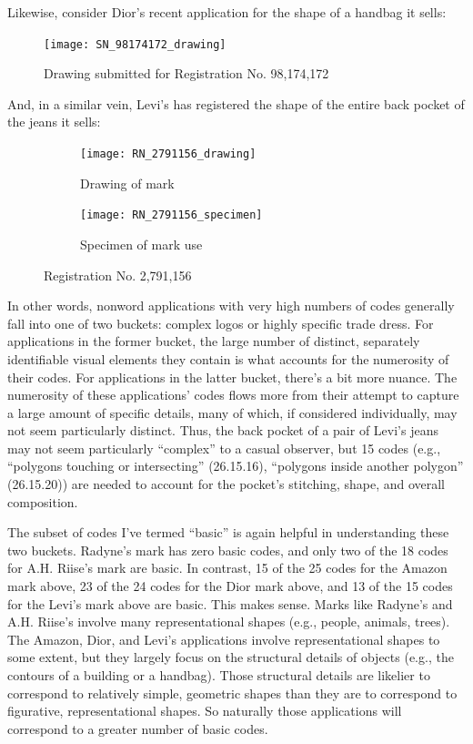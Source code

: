 \documentclass[letterpaper, 11pt, oneside]{article}
\begin{document}
\noindent Likewise, consider Dior's recent application for the shape of a handbag it sells: \

\begin{figure}[H]
\centering
\texttt{[image: SN\_98174172\_drawing]} \
\caption*{Drawing submitted for Registration No. 98,174,172}
\end{figure}
\par

\noindent And, in a similar vein, Levi's has registered the shape of the entire back pocket of the jeans it sells:

\begin{figure}[H]
\centering
\begin{subfigure}[h]{0.25\linewidth}
\texttt{[image: RN\_2791156\_drawing]} \
\caption{Drawing of mark}
\end{subfigure}
\hspace{30pt}
\begin{subfigure}[h]{0.25\linewidth}
\texttt{[image: RN\_2791156\_specimen]} \
\caption{Specimen of mark use}
\end{subfigure}
\caption*{Registration No. 2,791,156}
\end{figure}
\par

In other words, nonword applications with very high numbers of codes generally fall into one of two buckets: complex logos or highly specific trade dress. For applications in the former bucket, the large number of distinct, separately identifiable visual elements they contain is what accounts for the numerosity of their codes. For applications in the latter bucket, there's a bit more nuance. The numerosity of these applications' codes flows more from their attempt to capture a large amount of specific details, many of which, if considered individually, may not seem particularly distinct. Thus, the back pocket of a pair of Levi's jeans may not seem particularly ``complex'' to a casual observer, but 15 codes (e.g., ``polygons touching or intersecting'' (26.15.16),  ``polygons inside another polygon'' (26.15.20)) are needed to account for the pocket's stitching, shape, and overall composition.

The subset of codes I've termed ``basic'' is again helpful in understanding these two buckets. Radyne's mark has zero basic codes, and only two of the 18 codes for A.H. Riise's mark are basic. In contrast, 15 of the 25 codes for the Amazon mark above, 23 of the 24 codes for the Dior mark above, and 13 of the 15 codes for the Levi's mark above are basic. This makes sense. Marks like Radyne's and A.H. Riise's involve many representational shapes (e.g., people, animals, trees). The Amazon, Dior, and Levi's applications involve representational shapes to some extent, but they largely focus on the structural details of objects (e.g., the contours of a building or a handbag). Those structural details are likelier to correspond to relatively simple, geometric shapes than they are to correspond to figurative, representational shapes. So naturally those applications will correspond to a greater number of basic codes. 
\end{document}
